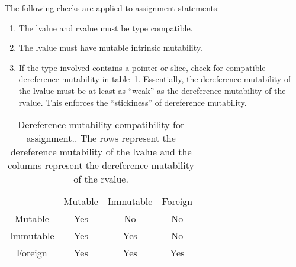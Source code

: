 
The following checks are applied to assignment statements:
\begin{enumerate}
\item The lvalue and rvalue must be type compatible.
\item The lvalue must have mutable intrinsic mutability.
\item If the type involved contains a pointer or slice, check for compatible dereference mutability in table~\ref{assignmut}.
  Essentially, the dereference mutability of the lvalue must be at least as ``weak'' as the dereference mutability of the rvalue.
  This enforces the ``stickiness'' of dereference mutability.
\end{enumerate}


\begin{table}
  \centering
  \begin{tabular}{cccc}
              & Mutable & Immutable & Foreign \\
    Mutable   & Yes     & No        & No      \\
    Immutable & Yes     & Yes       & No      \\
    Foreign   & Yes     & Yes       & Yes     \\
    \end{tabular}
  \caption{Dereference mutability compatibility for assignment.\label{assignmut}.  The rows represent the dereference mutability of the lvalue and the columns represent the dereference mutability of the rvalue.}
\end{table}

